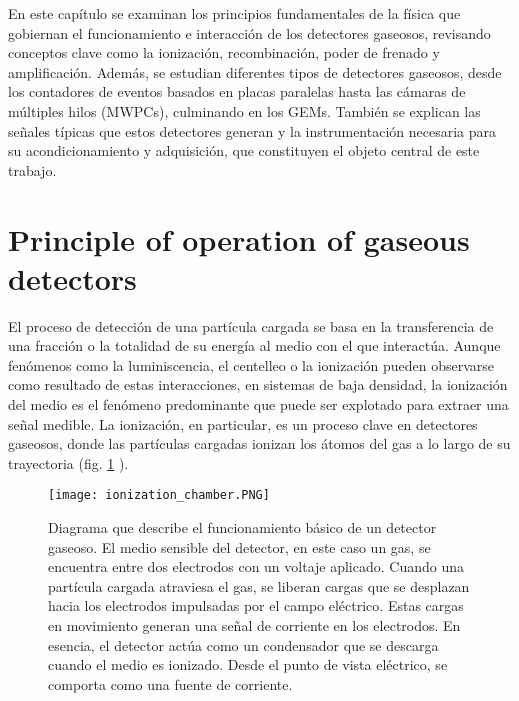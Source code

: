 \documentclass{article}
\begin{document}
\noindent En este capítulo se examinan los principios fundamentales de la física que gobiernan el funcionamiento e interacción de los detectores gaseosos, revisando conceptos clave como la ionización, recombinación, poder de frenado y amplificación. Además, se estudian diferentes tipos de detectores gaseosos, desde los contadores de eventos basados en placas paralelas hasta las cámaras de múltiples hilos (MWPCs), culminando en los GEMs. También se explican las señales típicas que estos detectores generan y la instrumentación necesaria para su acondicionamiento y adquisición, que constituyen el objeto central de este trabajo.

\section{Principle of operation of gaseous detectors}

\noindent El proceso de detección de una partícula cargada se basa en la transferencia de una fracción o la totalidad de su energía al medio con el que interactúa. Aunque fenómenos como la luminiscencia, el centelleo o la ionización pueden observarse como resultado de estas interacciones, en sistemas de baja densidad, la ionización del medio es el fenómeno predominante que puede ser explotado para extraer una señal medible. La ionización, en particular, es un proceso clave en detectores gaseosos, donde las partículas cargadas ionizan los átomos del gas a lo largo de su trayectoria (fig. \ref{fig:ionization_chamber} ).

\begin{figure}[H]
    \centering
    \texttt{[image: ionization\_chamber.PNG]}
    \caption{Diagrama que describe el funcionamiento básico de un detector gaseoso. El medio sensible del detector, en este caso un gas, se encuentra entre dos electrodos con un voltaje aplicado. Cuando una partícula cargada atraviesa el gas, se liberan cargas que se desplazan hacia los electrodos impulsadas por el campo eléctrico. Estas cargas en movimiento generan una señal de corriente en los electrodos. En esencia, el detector actúa como un condensador que se descarga cuando el medio es ionizado. Desde el punto de vista eléctrico, se comporta como una fuente de corriente.}
    \label{fig:ionization_chamber}

\end{figure}
\end{document}
